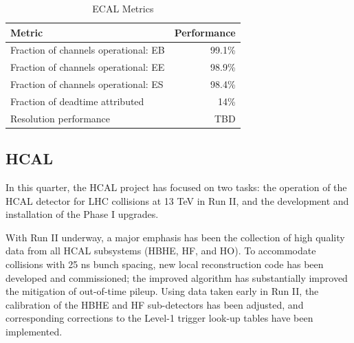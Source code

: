\begin{table}[htp]
\caption{ECAL Metrics}
\begin{center}
\begin{tabular}{|l|r|}
\hline
Metric&Performance\\
\hline
Fraction of channels operational: EB& 99.1\%\\
\hline
Fraction of channels operational: EE& 98.9\% \\
\hline
Fraction of channels operational: ES& 98.4\% \\
\hline
Fraction of deadtime attributed& 14\%\\
\hline
Resolution performance & TBD\\
\hline
\end{tabular}
\end{center}
\label{ECALMetrics}
\end{table}%





\subsection{HCAL}
In this quarter, the HCAL project has focused on two tasks:  
the operation of the HCAL detector for LHC collisions at 13 TeV in Run II, 
and the development and installation of the Phase I upgrades.

With Run II underway, a major emphasis has been the collection of high quality data from all HCAL subsystems (HBHE, HF, and HO). To accommodate collisions with 25 ns bunch spacing, new local reconstruction code has been developed and commissioned; the improved algorithm has substantially improved the mitigation of out-of-time pileup. Using data taken early in Run II, the calibration of the HBHE and HF sub-detectors has been adjusted, and corresponding corrections to the Level-1 trigger look-up tables have been implemented.

